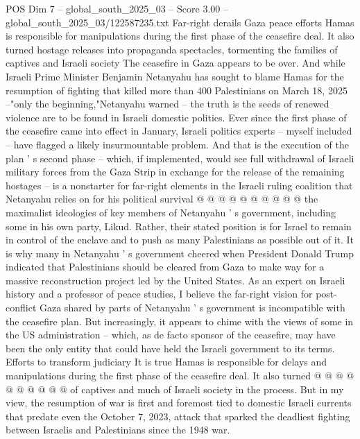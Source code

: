 \begin{textsample}{POS Dim 7 – global\_south\_2025\_03 – Score 3.00 – global\_south\_2025\_03/122587235.txt}  \label{ex:f7_pos_432}
Far-right derails Gaza peace efforts Hamas is responsible for manipulations during the first phase of the ceasefire deal.
It also turned hostage releases into propaganda spectacles, tormenting the families of captives and Israeli society The ceasefire in Gaza appears to be over.
And while Israeli Prime Minister Benjamin Netanyahu has sought to blame Hamas for the resumption of fighting that killed more than 400 Palestinians on March 18, 2025 --"only the beginning,"Netanyahu warned -- the truth is the seeds of renewed violence are to be found in Israeli domestic politics.
Ever since the first phase of the ceasefire came into effect in January, Israeli politics experts -- myself included -- have flagged a likely insurmountable problem.
And that is the execution of the plan ' s second phase -- which, if implemented, would see full withdrawal of Israeli military forces from the Gaza Strip in exchange for the release of the remaining hostages -- is a nonstarter for far-right elements in the Israeli ruling coalition that Netanyahu relies on for his political survival @ @ @ @ @ @ @ @ @ @ the maximalist ideologies of key members of Netanyahu ' s government, including some in his own party, Likud.
Rather, their stated position is for Israel to remain in control of the enclave and to push as many Palestinians as possible out of it.
It is why many in Netanyahu ' s government cheered when President Donald Trump indicated that Palestinians should be cleared from Gaza to make way for a massive reconstruction project led by the United States.
As an expert on Israeli history and a professor of peace studies, I believe the far-right vision for post-conflict Gaza shared by parts of Netanyahu ' s government is incompatible with the ceasefire plan.
But increasingly, it appears to chime with the views of some in the US administration -- which, as de facto sponsor of the ceasefire, may have been the only entity that could have held the Israeli government to its terms.
Efforts to transform judiciary It is true Hamas is responsible for delays and manipulations during the first phase of the ceasefire deal.
It also turned @ @ @ @ @ @ @ @ @ @ of captives and much of Israeli society in the process.
But in my view, the resumption of war is first and foremost tied to domestic Israeli currents that predate even the October 7, 2023, attack that sparked the deadliest fighting between Israelis and Palestinians since the 1948 war.

\end{textsample}
